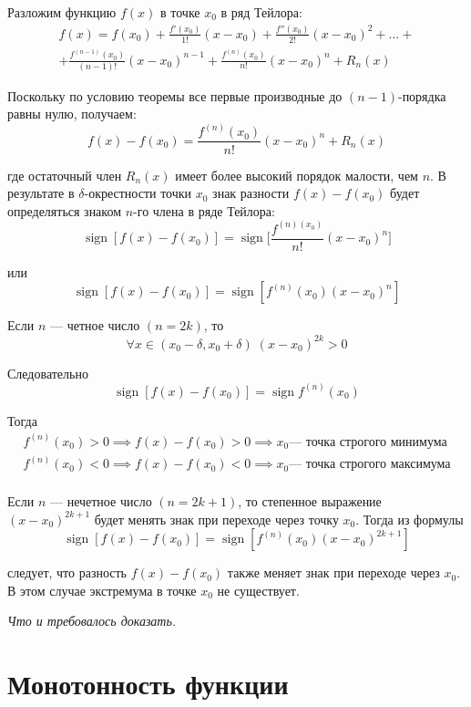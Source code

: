 \documentclass[a4paper,12pt,oneside]{extbook}
\DeclareMathOperator{\sign}{sign}
\newcommand{\newpar}{$ $\par\nobreak\ignorespaces}
\theoremstyle{numbered}
\theoremstyle{unnumbered}
\theoremstyle{named}
\theoremstyle{unnumbered}
\theoremstyle{named}
\theoremstyle{named}
\theoremstyle{named}
\renewenvironment{proof}[1][]{\breakenv[Доказательство]{\if\relax\detokenize{#1}\relax\else\;\fi}{\textbf{#1}}}{\smallskip\newpar \hfill\textit{Что и требовалось доказать.}}
\begin{document}
\begin{proof}
    Разложим функцию \(f(x)\) в точке \(x_0\) в ряд Тейлора:
    \begin{gather*}
        f(x) = f(x_0) + \frac{f'(x_0)}{1!}(x - x_0) + \frac{f''(x_0)}{2!}(x - x_0)^2 + \ldots + \\ + \frac{f^{(n - 1)}(x_0)}{(n - 1)!}(x - x_0)^{n - 1} + \frac{f^{(n)}(x_0)}{n!}(x - x_0)^n + R_n(x)
    \end{gather*}

    Поскольку по условию теоремы все первые производные до \((n - 1)\)-порядка равны нулю, получаем:
    \[
        f(x) - f(x_0) = \frac{f^{(n)}(x_0)}{n!}(x - x_0)^n + R_n(x)
    \]

    где остаточный член \(R_n(x)\) имеет более высокий порядок малости, чем \(n\). В результате в \(\delta\)-окрестности точки \(x_0\) знак разности \(f(x) - f(x_0)\) будет определяться знаком \(n\)-го члена в ряде Тейлора:
    \[
        \sign{[f(x) - f(x_0)]} = \sign{\Big[\frac{f^{(n)(x_0)}}{n!}(x - x_0)^n\Big]}
    \]

    или
    \[
        \sign{[f(x) - f(x_0)]} = \sign{[f^{(n)}(x_0)(x - x_0)^n]}
    \]

    Если \(n\) — четное число \((n = 2k)\), то
    \[
        \forall x \in (x_0 - \delta, x_0 + \delta) \; (x - x_0)^{2k} > 0
    \]

    Следовательно
    \[
        \sign{[f(x) - f(x_0)]} = \sign{f^{(n)}(x_0)}
    \]

    Тогда
    \begin{gather*}
        f^{(n)}(x_0) > 0 \implies f(x) - f(x_0) > 0 \implies x_0 \text{— точка строгого минимума}  \\
        f^{(n)}(x_0) < 0 \implies f(x) - f(x_0) < 0 \implies x_0 \text{— точка строгого максимума} \\
    \end{gather*}

    Если \(n\) — нечетное число \((n = 2k + 1)\), то степенное выражение \((x - x_0)^{2k + 1}\) будет менять знак при переходе через точку \(x_0\). Тогда из формулы
    \[
        \sign{[f(x) - f(x_0)]} = \sign{[f^{(n)}(x_0)(x - x_0)^{2k + 1}]}
    \]

    следует, что разность \(f(x) - f(x_0)\) также меняет знак при переходе через \(x_0\). В этом случае экстремума в точке \(x_0\) не существует.
\end{proof}

\section{Монотонность функции}%
\label{sec:Монотонность функции}
\end{document}
